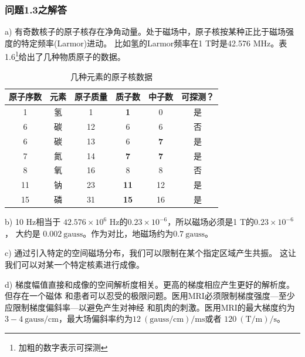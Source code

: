 \subsubsection{问题1.3之解答}
a) 有奇数核子的原子核存在净角动量。处于磁场中，原子核按某种正比于磁场强度的特定频率(Larmor)进动。
比如氢的Larmor频率在1 T时是42.576 MHz。表1.6\footnote{加粗的数字表示可探测}给出了几种物质原子的数据。
\begin{table}[htbp]\small
  \centering
  \caption{几种元素的原子核数据} \label{tb:atomic}
\begin{tabular}{|c||c|c|c|c|c|}
  \hline
原子序数&元素&原子质量&质子数&中子数&可探测？ \\ \hline \hline
1&氢&1&\textbf{1}&0&是 \\ \hline
6&碳&12&6&6&否 \\ \hline
6&碳&13&6&\textbf{7}&是 \\ \hline
7&氮&14&\textbf{7}&\textbf{7}&是 \\ \hline
8&氧&16&8&8&否 \\ \hline
11&钠&23&\textbf{11}&12&是 \\ \hline
15&磷&31&\textbf{15}&16&是 \\ \hline
\end{tabular}
\end{table}

b) 10 Hz相当于 $42.576×10^6$ Hz的$0.23×10^{−6}$，所以磁场必须是1 T的$0.23×10^{−6}$ ，
大约是 $0.002\ \mathrm{gauss}$。作为对比，地磁场约为$0.7 \ \mathrm{gauss}$。

c) 通过引入特定的空间磁场分布，我们可以限制在某个指定区域产生共振。
这让我们可以对某一个特定核素进行成像。

d) 梯度幅值直接和成像的空间解析度相关。更高的梯度相应产生更好的解析度。但存在一个磁体
和患者可以忍受的极限问题。医用MRI必须限制梯度强度---至少应限制梯度偏斜率---以避免产生对神经
和肌肉的刺激。医用MRI的最大梯度约为$3-4 \ \mathrm{gauss/cm}$，最大场偏斜率约为$12\ \mathrm{(gauss/cm)/ms}$或者
$120\ \mathrm{(T/m)/s}$。

